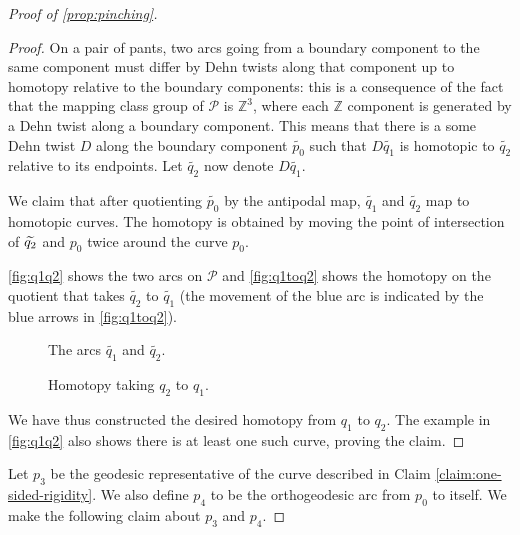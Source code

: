 \begin{proof}[Proof of \autoref{prop:pinching}]
\begin{proof}
    On a pair of pants, two arcs going from a boundary component to the same component must differ by Dehn twists along that component up to homotopy relative to the boundary components: this is a consequence of the fact that the mapping class group of $\mathcal{P}$ is $\mathbb{Z}^3$, where each $\mathbb{Z}$ component is generated by a Dehn twist along a boundary component.
    This means that there is a some Dehn twist $D$ along the boundary component $\widetilde{p_0}$ such that $D\widetilde{q_1}$ is homotopic to $\widetilde{q_2}$ relative to its endpoints. Let $\widetilde{q_2}$ now denote $D\widetilde{q_1}$.

    We claim that after quotienting $\widetilde{p_0}$ by the antipodal map, $\widetilde{q_1}$ and $\widetilde{q_2}$ map to homotopic curves.
    The homotopy is obtained by moving the point of intersection of $\widetilde{q_2}$ and $p_0$ twice around the curve $p_0$.

    \autoref{fig:q1q2} shows the two arcs on $\mathcal{P}$ and \autoref{fig:q1toq2} shows the homotopy on the quotient that takes $\widetilde{q_2}$ to $\widetilde{q_1}$ (the movement of the blue arc is indicated by the blue arrows in \autoref{fig:q1toq2}).
    \begin{figure}[h]
      \centering
      \caption{The arcs $\widetilde{q_1}$ and $\widetilde{q_2}$.}
      \label{fig:q1q2}
    \end{figure}

    \begin{figure}[h]
      \centering
      \caption{Homotopy taking $q_2$ to $q_1$.}
      \label{fig:q1toq2}
    \end{figure}

    We have thus constructed the desired homotopy from $q_1$ to $q_2$.
    The example in \autoref{fig:q1q2} also shows there is at least one such curve, proving the claim.
  \end{proof}

  Let $p_3$ be the geodesic representative of the curve described in Claim \ref{claim:one-sided-rigidity}.
  We also define $p_4$ to be the orthogeodesic arc from $p_0$ to itself.
  We make the following claim about $p_3$ and $p_4$.


\end{proof}
